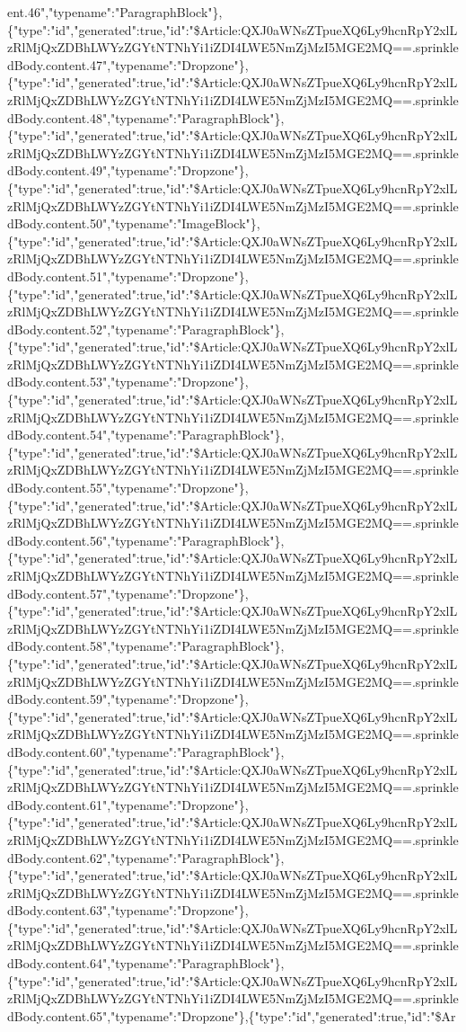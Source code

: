 ent.46","typename":"ParagraphBlock"\},\{"type":"id","generated":true,"id":"\$Article:QXJ0aWNsZTpueXQ6Ly9hcnRpY2xlLzRlMjQxZDBhLWYzZGYtNTNhYi1iZDI4LWE5NmZjMzI5MGE2MQ==.sprinkledBody.content.47","typename":"Dropzone"\},\{"type":"id","generated":true,"id":"\$Article:QXJ0aWNsZTpueXQ6Ly9hcnRpY2xlLzRlMjQxZDBhLWYzZGYtNTNhYi1iZDI4LWE5NmZjMzI5MGE2MQ==.sprinkledBody.content.48","typename":"ParagraphBlock"\},\{"type":"id","generated":true,"id":"\$Article:QXJ0aWNsZTpueXQ6Ly9hcnRpY2xlLzRlMjQxZDBhLWYzZGYtNTNhYi1iZDI4LWE5NmZjMzI5MGE2MQ==.sprinkledBody.content.49","typename":"Dropzone"\},\{"type":"id","generated":true,"id":"\$Article:QXJ0aWNsZTpueXQ6Ly9hcnRpY2xlLzRlMjQxZDBhLWYzZGYtNTNhYi1iZDI4LWE5NmZjMzI5MGE2MQ==.sprinkledBody.content.50","typename":"ImageBlock"\},\{"type":"id","generated":true,"id":"\$Article:QXJ0aWNsZTpueXQ6Ly9hcnRpY2xlLzRlMjQxZDBhLWYzZGYtNTNhYi1iZDI4LWE5NmZjMzI5MGE2MQ==.sprinkledBody.content.51","typename":"Dropzone"\},\{"type":"id","generated":true,"id":"\$Article:QXJ0aWNsZTpueXQ6Ly9hcnRpY2xlLzRlMjQxZDBhLWYzZGYtNTNhYi1iZDI4LWE5NmZjMzI5MGE2MQ==.sprinkledBody.content.52","typename":"ParagraphBlock"\},\{"type":"id","generated":true,"id":"\$Article:QXJ0aWNsZTpueXQ6Ly9hcnRpY2xlLzRlMjQxZDBhLWYzZGYtNTNhYi1iZDI4LWE5NmZjMzI5MGE2MQ==.sprinkledBody.content.53","typename":"Dropzone"\},\{"type":"id","generated":true,"id":"\$Article:QXJ0aWNsZTpueXQ6Ly9hcnRpY2xlLzRlMjQxZDBhLWYzZGYtNTNhYi1iZDI4LWE5NmZjMzI5MGE2MQ==.sprinkledBody.content.54","typename":"ParagraphBlock"\},\{"type":"id","generated":true,"id":"\$Article:QXJ0aWNsZTpueXQ6Ly9hcnRpY2xlLzRlMjQxZDBhLWYzZGYtNTNhYi1iZDI4LWE5NmZjMzI5MGE2MQ==.sprinkledBody.content.55","typename":"Dropzone"\},\{"type":"id","generated":true,"id":"\$Article:QXJ0aWNsZTpueXQ6Ly9hcnRpY2xlLzRlMjQxZDBhLWYzZGYtNTNhYi1iZDI4LWE5NmZjMzI5MGE2MQ==.sprinkledBody.content.56","typename":"ParagraphBlock"\},\{"type":"id","generated":true,"id":"\$Article:QXJ0aWNsZTpueXQ6Ly9hcnRpY2xlLzRlMjQxZDBhLWYzZGYtNTNhYi1iZDI4LWE5NmZjMzI5MGE2MQ==.sprinkledBody.content.57","typename":"Dropzone"\},\{"type":"id","generated":true,"id":"\$Article:QXJ0aWNsZTpueXQ6Ly9hcnRpY2xlLzRlMjQxZDBhLWYzZGYtNTNhYi1iZDI4LWE5NmZjMzI5MGE2MQ==.sprinkledBody.content.58","typename":"ParagraphBlock"\},\{"type":"id","generated":true,"id":"\$Article:QXJ0aWNsZTpueXQ6Ly9hcnRpY2xlLzRlMjQxZDBhLWYzZGYtNTNhYi1iZDI4LWE5NmZjMzI5MGE2MQ==.sprinkledBody.content.59","typename":"Dropzone"\},\{"type":"id","generated":true,"id":"\$Article:QXJ0aWNsZTpueXQ6Ly9hcnRpY2xlLzRlMjQxZDBhLWYzZGYtNTNhYi1iZDI4LWE5NmZjMzI5MGE2MQ==.sprinkledBody.content.60","typename":"ParagraphBlock"\},\{"type":"id","generated":true,"id":"\$Article:QXJ0aWNsZTpueXQ6Ly9hcnRpY2xlLzRlMjQxZDBhLWYzZGYtNTNhYi1iZDI4LWE5NmZjMzI5MGE2MQ==.sprinkledBody.content.61","typename":"Dropzone"\},\{"type":"id","generated":true,"id":"\$Article:QXJ0aWNsZTpueXQ6Ly9hcnRpY2xlLzRlMjQxZDBhLWYzZGYtNTNhYi1iZDI4LWE5NmZjMzI5MGE2MQ==.sprinkledBody.content.62","typename":"ParagraphBlock"\},\{"type":"id","generated":true,"id":"\$Article:QXJ0aWNsZTpueXQ6Ly9hcnRpY2xlLzRlMjQxZDBhLWYzZGYtNTNhYi1iZDI4LWE5NmZjMzI5MGE2MQ==.sprinkledBody.content.63","typename":"Dropzone"\},\{"type":"id","generated":true,"id":"\$Article:QXJ0aWNsZTpueXQ6Ly9hcnRpY2xlLzRlMjQxZDBhLWYzZGYtNTNhYi1iZDI4LWE5NmZjMzI5MGE2MQ==.sprinkledBody.content.64","typename":"ParagraphBlock"\},\{"type":"id","generated":true,"id":"\$Article:QXJ0aWNsZTpueXQ6Ly9hcnRpY2xlLzRlMjQxZDBhLWYzZGYtNTNhYi1iZDI4LWE5NmZjMzI5MGE2MQ==.sprinkledBody.content.65","typename":"Dropzone"\},\{"type":"id","generated":true,"id":"\$Ar
